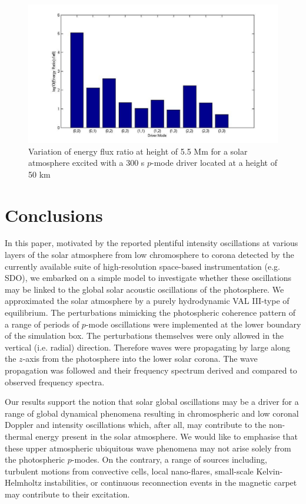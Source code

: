 \documentclass[preprint,authoryear,12pt]{elsarticle}
\begin{document}
\begin{figure}[t]
\includegraphics[scale=2]{imrescale/ratio_varoverdrve_eflux_vperiod_forallmodes_300s_5p5Mm.jpg}
\caption{Variation of energy flux ratio at height of 5.5 Mm for a solar atmosphere excited with a 300 s $p$-mode driver 
located at a height of 50 km}
\label{Fig19}
\end{figure}




\section{Conclusions}

In this paper, motivated by the reported plentiful intensity oscillations at various layers of the solar atmosphere from low chromosphere to corona detected by the currently available suite of high-resolution space-based instrumentation (e.g. SDO), we embarked on a simple model to investigate whether these oscillations may be linked to the global solar acoustic oscillations of the photosphere. We approximated the solar atmosphere by a purely hydrodynamic VAL III-type of equilibrium. The perturbations mimicking the photospheric coherence pattern of a range of periods of $p$-mode oscillations were implemented at the lower boundary of the simulation box. The perturbations themselves were only allowed in the vertical (i.e. radial) direction. Therefore waves were propagating by large along the $z$-axis from the photosphere into the lower solar corona. The wave propagation was followed and their frequency spectrum derived and compared to observed frequency spectra.

Our results support the notion that solar global oscillations may be a driver for a range of global dynamical phenomena 
resulting in chromospheric and low coronal Doppler and intensity oscillations which, after all, may contribute to the non-thermal energy present in the solar atmosphere. We would like to emphasise that these upper atmospheric ubiquitous wave phenomena may not arise solely from the photospheric $p$-modes. On the contrary, a range of sources including, turbulent motions from convective cells, local nano-flares, small-scale Kelvin-Helmholtz instabilities, or continuous reconnection events in the magnetic carpet may contribute to their excitation. 
\end{document}
